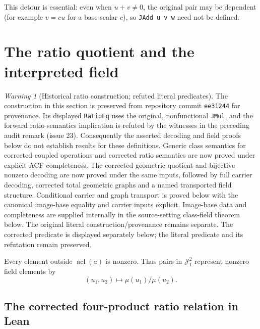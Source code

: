 \documentclass[11pt,oneside]{article}
\theoremstyle{definition}
\theoremstyle{remark}
\newtheorem{warning}[theorem]{Warning}
\newcommand{\acl}{\operatorname{acl}}
\newcommand{\Jrel}{\mathcal{J}}
\newcommand{\lean}[1]{\nolinkurl{#1}}
\begin{document}
This detour is essential:
even when $u+v\neq0$, the original pair may be dependent (for example $v=cu$ for a
base scalar $c$), so \lean{JAdd u v w} need not be defined.

\section{The ratio quotient and the interpreted field}

\begin{warning}[Historical ratio construction; refuted literal predicates]
The construction in this section is preserved from repository commit
\texttt{ee31244} for provenance. Its displayed \lean{RatioEq} uses the original,
nonfunctional \lean{JMul}, and the forward ratio-semantics implication is
refuted by the witnesses in the preceding audit remark (issue 23).
Consequently the asserted decoding and field proofs below do not establish
results for these definitions. Generic class semantics for corrected coupled
operations and corrected ratio semantics are now proved under explicit ACF completeness.
The corrected geometric quotient and bijective nonzero decoding are now proved under
the same inputs, followed by full carrier decoding, corrected total geometric graphs and
a named transported field structure. Conditional carrier and graph transport is proved
below with the canonical image-base equality and carrier inputs explicit. Image-base data and
completeness are supplied internally in the source-setting class-field theorem below. The
original literal construction/provenance remains separate.
The corrected predicate is displayed separately below;
the literal predicate and its refutation remain preserved.
\end{warning}

Every element outside $\acl(a)$ is nonzero.  Thus pairs in $\Jrel_1^2$ represent nonzero
field elements by
\[
  (u_1,u_2)\longmapsto \mu(u_1)/\mu(u_2).
\]

\subsection{The corrected four-product ratio relation in Lean}
\end{document}
